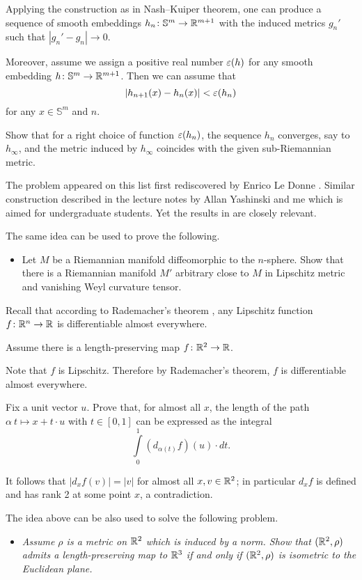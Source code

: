 Applying the construction as in Nash--Kuiper theorem,
one can produce a sequence of smooth embeddings $h_n\colon\mathbb{S}^m\to \mathbb{R}^{m+1}$ with the induced metrics $g_n'$
such that $|g_n'-g_n|\to 0$.

Moreover, assume we assign a positive real number $\varepsilon(h)$ for any smooth embedding $h\colon\mathbb{S}^m\to\mathbb{R}^{m+1}$.
Then we can assume that 
\[|h_{n+1}(x)-h_n(x)|<\varepsilon(h_n)\] for any $x\in \mathbb{S}^m$ and $n$.

Show that for a right choice of function $\varepsilon(h_n)$,
the sequence $h_n$ converges, say to $h_\infty$, 
and the metric induced by $h_\infty$ coincides with the given sub-Riemannian metric.\qeds


The problem appeared 
on this list first rediscovered by Enrico Le Donne \cite[see][]{le-donne}.
Similar construction described in the lecture notes by Allan Yashinski and me \cite[see][]{petrunin-yashinsky} 
which is aimed for undergraduate students. 
Yet the results in \cite{petrunin-paths} are closely relevant.

The same idea can be used to prove the following.
\begin{itemize}
\item Let $M$ be a Riemannian manifold diffeomorphic to the $n$-sphere. 
Show that there is a Riemannian manifold $M'$ arbitrary close to $M$ in Lipschitz metric and vanishing Weyl curvature tensor.
\end{itemize}


Recall that according to Rademacher's theorem \cite{rademacher},
any Lipschitz function $f\colon\mathbb{R}^n\to\mathbb{R}$ 
is differentiable almost everywhere.


Assume there is a length-preserving map $f\colon\mathbb{R}^2\to \mathbb{R}$.

Note that $f$ is Lipschitz.
Therefore by Rademacher's theorem, $f$ is differentiable almost everywhere.

Fix a unit vector $u$.
Prove that, for almost all $x$, the length of the path 
$\alpha\:t\mapsto x+t\cdot u$ with $t\in[0,1]$ can be expressed as the integral
\[\int\limits_0^1 (d_{\alpha(t)}f)(u) \cdot dt.\]

It follows that $|d_xf(v)|=|v|$ for almost all $x,v\in\mathbb{R}^2$;
in particular $d_xf$ is defined and has rank 2 at some point $x$, a contradiction. \qeds 


The idea above can be also used to solve the following problem.

\begin{itemize}
\item {\it Assume $\rho$ is a metric on $\mathbb{R}^2$ 
which is induced by a norm.
Show that $(\mathbb{R}^2,\rho)$ admits 
a length-preserving map
to $\mathbb{R}^3$ 
if and only if 
$(\mathbb{R}^2,\rho)$ is isometric to the Euclidean plane.}
\end{itemize}









